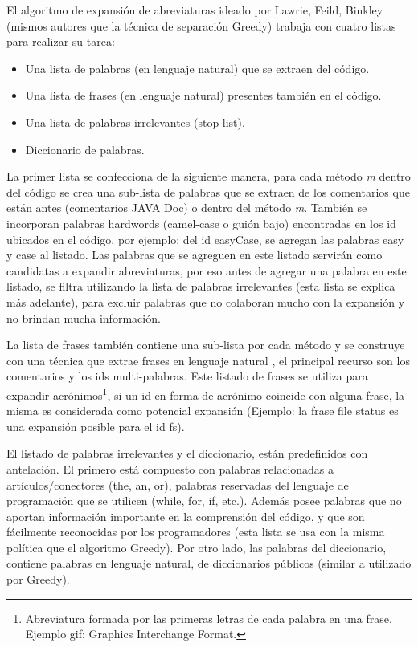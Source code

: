 El algoritmo de expansión de abreviaturas ideado por Lawrie, Feild, Binkley (mismos autores que la técnica de separación Greedy) \cite{LFBEX07} trabaja con cuatro listas para realizar su tarea:

\begin{itemize}
\itemsep0em%
\item Una lista de palabras (en lenguaje natural) que se extraen del código.
\item Una lista de frases (en lenguaje natural) presentes también en el código.
\item Una lista de palabras irrelevantes (stop-list).
\item Diccionario de palabras.
\end{itemize}


La primer lista se confecciona de la siguiente manera, para cada método \textit{m} dentro del código se crea una sub-lista de palabras que se extraen de los comentarios que están antes (comentarios JAVA Doc) o dentro del método \textit{m}. También se incorporan palabras hardwords (camel-case o guión bajo) encontradas en los id ubicados en el código, por ejemplo: del id \textsf{easyCase}, se agregan las palabras \textsf{easy} y \textsf{case} al listado. Las palabras que se agreguen en este listado servirán como candidatas a expandir abreviaturas, por eso antes de agregar una palabra en este listado, se filtra utilizando la lista de palabras irrelevantes (esta lista se explica más adelante), para excluir palabras que no colaboran mucho con la expansión y no brindan mucha información.

La lista de frases también contiene una sub-lista por cada método y se construye con una técnica que extrae frases en lenguaje natural \cite{FFCW01}, el principal recurso son los comentarios y los ids multi-palabras. Este listado de frases se utiliza para expandir acrónimos\footnote[1]{Abreviatura formada por las primeras letras de cada palabra en una frase. Ejemplo gif: Graphics Interchange Format.}, si un id en forma de acrónimo coincide con alguna frase, la misma es considerada como potencial expansión \cite{LOPT00} (Ejemplo: la frase \textsf{file status} es una expansión posible para el id \textsf{fs}).

El listado de palabras irrelevantes y el diccionario, están predefinidos con antelación. El primero está compuesto con palabras relacionadas a artículos/conectores (the, an, or), palabras reservadas del lenguaje de programación que se utilicen (\textsf{while, for, if,} etc.). Además posee palabras que no aportan información importante en la comprensión del código, y que son fácilmente reconocidas por los programadores (esta lista se usa con la misma política que el algoritmo Greedy). Por otro lado, las palabras del diccionario, contiene palabras en lenguaje natural, de diccionarios públicos (similar a utilizado por Greedy).

